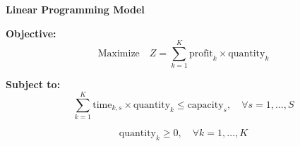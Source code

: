 \documentclass{article}
\begin{document}
\textbf{Linear Programming Model}

\textbf{Objective:}
\[
\text{Maximize} \quad Z = \sum_{k=1}^{K} \text{profit}_{k} \times \text{quantity}_{k}
\]

\textbf{Subject to:}
\[
\sum_{k=1}^{K} \text{time}_{k,s} \times \text{quantity}_{k} \leq \text{capacity}_{s}, \quad \forall s = 1, \ldots, S
\]

\[
\text{quantity}_{k} \geq 0, \quad \forall k = 1, \ldots, K
\]
\end{document}
